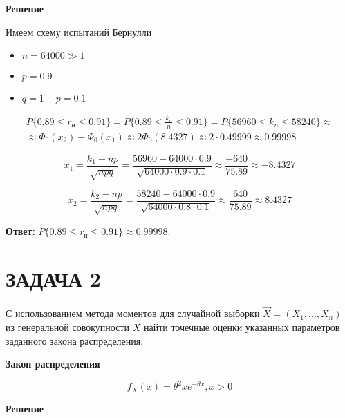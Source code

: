 \textbf{Решение}

Имеем схему испытаний Бернулли

\begin{itemize}
    \item $n = 64000 \gg 1$
    \item $p = 0.9$
    \item $q = 1 - p = 0.1$
\end{itemize}

\begin{multline*}
    P \{ 0.89 \le r_\text{н} \le 0.91 \} = P \{ 0.89 \le \frac{k_n}{n} \le 0.91 \} = P \{ 56960 \le k_n \le 58240 \} \approx \\
    \approx \Phi_0(x_2) - \Phi_0(x_1) \approx 2 \Phi_0 (8.4327) \approx 2 \cdot 0.49999 \approx 0.99998
\end{multline*}

\begin{equation*}
    x_1 = \frac{k_1 - np}{\sqrt{npq}} = \frac{56960 - 64000 \cdot 0.9}{\sqrt{64000 \cdot 0.9 \cdot 0.1}} \approx \frac{-640}{75.89} \approx -8.4327
\end{equation*}

\begin{equation*}
    x_2 = \frac{k_2 - np}{\sqrt{npq}} = \frac{58240 - 64000 \cdot 0.9}{\sqrt{64000 \cdot 0.8 \cdot 0.1}} \approx \frac{640}{75.89} \approx 8.4327
\end{equation*}

\textbf{Ответ:} $P \{ 0.89 \le r_\text{н} \le 0.91 \} \approx 0.99998.$

\section{ЗАДАЧА 2}

С использованием метода моментов для случайной выборки $\vec X = (X_1, ..., X_n)$ из генеральной совокупности $X$ найти точечные оценки указанных параметров заданного закона распределения.

\textbf{Закон распределения}

\begin{equation*}
    f_X(x) = \theta^2 xe^{-\theta x}, x > 0
\end{equation*}

\textbf{Решение}

